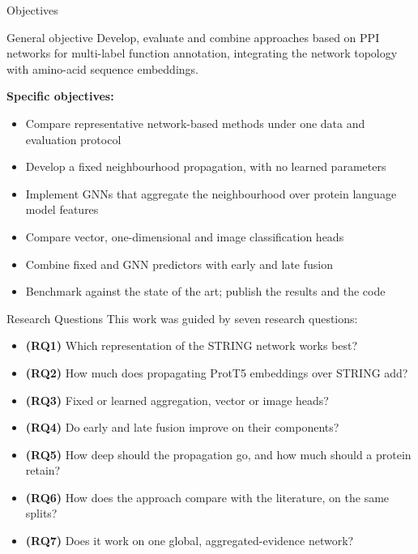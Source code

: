 \documentclass[aspectratio=169,11pt]{beamer}
\begin{document}
\begin{frame}{Objectives}
  \begin{block}{General objective}
    Develop, evaluate and combine approaches based on PPI networks for multi-label function annotation,
    integrating the network topology with amino-acid sequence embeddings.
  \end{block}
  \textbf{Specific objectives:}
  \begin{itemize}\small
    \item Compare representative network-based methods under one data and evaluation protocol
    \item Develop a fixed neighbourhood propagation, with no learned parameters
    \item Implement GNNs that aggregate the neighbourhood over protein language model features
    \item Compare vector, one-dimensional and image classification heads
    \item Combine fixed and GNN predictors with early and late fusion
    \item Benchmark against the state of the art; publish the results and the code
  \end{itemize}
\end{frame}

\begin{frame}{Research Questions}
  This work was guided by seven research questions:
  \vspace{0.3em}
  \begin{itemize}\setlength{\itemsep}{0.25em}
    \item \textbf{(RQ1)} Which representation of the STRING network works best?
    \item \textbf{(RQ2)} How much does propagating ProtT5 embeddings over STRING add?
    \item \textbf{(RQ3)} Fixed or learned aggregation, vector or image heads?
    \item \textbf{(RQ4)} Do early and late fusion improve on their components?
    \item \textbf{(RQ5)} How deep should the propagation go, and how much should a protein retain?
    \item \textbf{(RQ6)} How does the approach compare with the literature, on the same splits?
    \item \textbf{(RQ7)} Does it work on one global, aggregated-evidence network?
  \end{itemize}
\end{frame}
\end{document}
